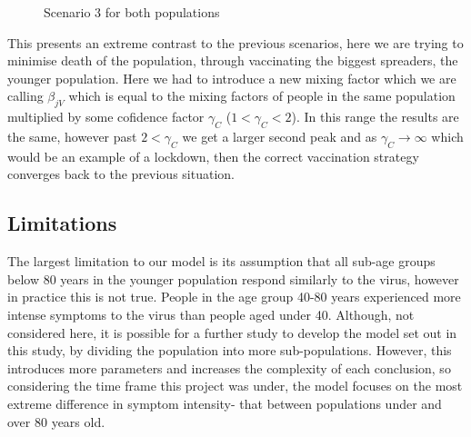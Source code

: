 \documentclass{article}
\begin{document}
\begin{figure}[ht!]
\hspace{\fill}
\caption{Scenario 3 for both populations}
\end{figure}

\noindent
This presents an extreme contrast to the previous scenarios, here we are trying to minimise death of the population, through vaccinating the biggest spreaders, the younger population. Here we had to introduce a new mixing factor which we are calling $\beta_{jV}$ which is equal to the mixing factors of people in the same population multiplied by some cofidence factor $\gamma_C$ ($1 < \gamma_C < 2$). In this range the results are the same, however past $2 < \gamma_C$ we get a larger second peak and as $\gamma_C \to \infty$ which would be an example of a lockdown, then the correct vaccination strategy converges back to the previous situation.\\



\subsection{Limitations}
\noindent
The largest limitation to our model is its assumption that all sub-age groups below 80 years in the younger population respond similarly to the virus, however in practice this is not true. People in the age group 40-80 years experienced more intense symptoms to the virus than people aged under 40. Although, not considered here, it is possible for a further study to develop the model set out in this study, by dividing the population into more sub-populations. However, this introduces more parameters and increases the complexity of each conclusion, so considering the time frame this project was under, the model focuses on the most extreme difference in symptom intensity- that between populations under and over 80 years old.\\
\end{document}
